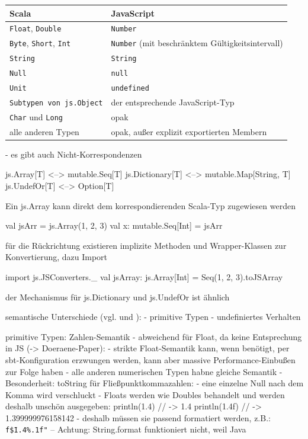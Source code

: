 \documentclass[a4paper, 12pt, listof=totoc, bibliography=totoc]{scrreprt}
\begin{document}
\begin{tabular}{|l|l|}
\hline \textbf{Scala} & \textbf{JavaScript} \\ 
\hline \texttt{Float}, \texttt{Double} & \texttt{Number} \\ 
\hline \texttt{Byte}, \texttt{Short}, \texttt{Int} & \texttt{Number} (mit beschränktem Gültigkeitsintervall) \\ 
\hline \texttt{String} & \texttt{String} \\ 
\hline \texttt{Null} & \texttt{null} \\ 
\hline \texttt{Unit} & \texttt{undefined} \\ 
\hline \texttt{Subtypen von js.Object} & der entsprechende JavaScript-Typ \\ 
\hline \texttt{Char} und \texttt{Long} & opak \\ 
\hline alle anderen Typen & opak, außer explizit exportierten Membern \\ 
\hline 
\end{tabular}

\medskip


- es gibt auch Nicht-Korrespondenzen


js.Array[T] <--> mutable.Seq[T]
js.Dictionary[T] <--> mutable.Map[String, T]
js.UndefOr[T] <--> Option[T]

Ein js.Array kann direkt dem korrespondierenden Scala-Typ zugewiesen werden

val jsArr = js.Array(1, 2, 3)
val x: mutable.Seq[Int] = jsArr

für die Rückrichtung existieren implizite Methoden und Wrapper-Klassen zur Konvertierung, dazu Import

import js.JSConverters.\_
val jsArray: js.Array[Int] = Seq(1, 2, 3).toJSArray

der Mechanismus für js.Dictionary und js.UndefOr ist ähnlich






semantische Unterschiede (vgl. \cite{doeraene2015.SSP} und \cite{scalajs.DSS}):
	- primitive Typen
	- undefiniertes Verhalten

primitive Typen: Zahlen-Semantik
	- abweichend für Float, da keine Entsprechung in JS (-> Doeraene-Paper):
    - strikte Float-Semantik kann, wenn benötigt, per sbt-Konfiguration erzwungen werden, kann aber massive Performance-Einbußen zur Folge haben
    - alle anderen numerischen Typen habne gleiche Semantik
    - Besonderheit: toString für Fließpunktkommazahlen:
    	- eine einzelne Null nach dem Komma wird verschluckt
    	- Floats werden wie Doubles behandelt und werden deshalb unschön ausgegeben:
    	println(1.4)  // -> 1.4
		println(1.4f) // -> 1.399999976158142
	- deshalb müssen sie passend formatiert werden, z.B.: \texttt{f\"\${1.4}\%.1f"}  --  Achtung: String.format funktioniert nicht, weil Java
\end{document}
